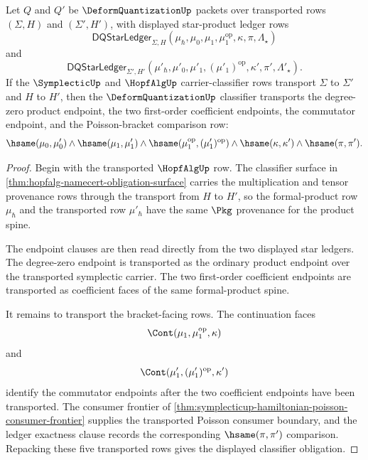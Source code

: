 \begin{theorem}
\label{thm:deformquantization-bracket-classifier-obligation}
Let $Q$ and $Q'$ be $\DeformQuantizationUp$ packets over transported rows $(\Sigma,H)$ and $(\Sigma',H')$, with displayed star-product ledger rows
$$
\mathsf{DQStarLedger}_{\Sigma,H}(\mu_\hbar,\mu_0,\mu_1,\mu_1^{\mathrm{op}},\kappa,\pi,\Lambda_\star)
$$
and
$$
\mathsf{DQStarLedger}_{\Sigma',H'}(\mu'_\hbar,\mu'_0,\mu'_1,(\mu'_1)^{\mathrm{op}},\kappa',\pi',\Lambda'_\star).
$$
If the $\SymplecticUp$ and $\HopfAlgUp$ carrier-classifier rows transport $\Sigma$ to $\Sigma'$ and $H$ to $H'$, then the $\DeformQuantizationUp$ classifier transports the degree-zero product endpoint, the two first-order coefficient endpoints, the commutator endpoint, and the Poisson-bracket comparison row:
$$
\hsame(\mu_0,\mu'_0)\land\hsame(\mu_1,\mu'_1)\land\hsame(\mu_1^{\mathrm{op}},(\mu'_1)^{\mathrm{op}})\land\hsame(\kappa,\kappa')\land\hsame(\pi,\pi').
$$
\end{theorem}
\begin{proof}
Begin with the transported $\HopfAlgUp$ row. The classifier surface in \autoref{thm:hopfalg-namecert-obligation-surface} carries the multiplication and tensor provenance rows through the transport from $H$ to $H'$, so the formal-product row $\mu_\hbar$ and the transported row $\mu'_\hbar$ have the same $\Pkg$ provenance for the product spine.

The endpoint clauses are then read directly from the two displayed star ledgers. The degree-zero endpoint is transported as the ordinary product endpoint over the transported symplectic carrier. The two first-order coefficient endpoints are transported as coefficient faces of the same formal-product spine.

It remains to transport the bracket-facing rows. The continuation faces
$$
\Cont(\mu_1,\mu_1^{\mathrm{op}},\kappa)
$$
and
$$
\Cont(\mu'_1,(\mu'_1)^{\mathrm{op}},\kappa')
$$
identify the commutator endpoints after the two coefficient endpoints have been transported. The consumer frontier of \autoref{thm:symplecticup-hamiltonian-poisson-consumer-frontier} supplies the transported Poisson consumer boundary, and the ledger exactness clause records the corresponding $\hsame(\pi,\pi')$ comparison. Repacking these five transported rows gives the displayed classifier obligation.
\end{proof}

